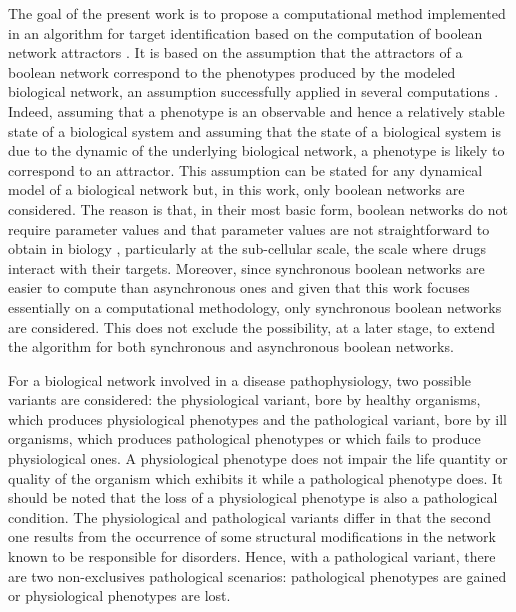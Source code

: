 \documentclass[oneside,a4paper,onecolumn,notitlepage,final]{article}
\begin{document}
The goal of the present work is to propose a computational method implemented in an algorithm for target identification based on the computation of boolean network attractors \cite{bornholdt2008boolean}. It is based on the assumption that the attractors of a boolean network correspond to the phenotypes produced by the modeled biological network, an assumption successfully applied in several computations \cite{huang2000shape,davidich2008boolean,faure2006dynamical,fumia2013boolean,creixell2012navigating,baverstock2011comparison}. Indeed, assuming that a phenotype is an observable and hence a relatively stable state of a biological system and assuming that the state of a biological system is due to the dynamic of the underlying biological network, a phenotype is likely to correspond to an attractor. This assumption can be stated for any dynamical model of a biological network but, in this work, only boolean networks are considered. The reason is that, in their most basic form, boolean networks do not require parameter values and that parameter values are not straightforward to obtain in biology \cite{wynn2012logic}, particularly at the sub-cellular scale, the scale where drugs interact with their targets. Moreover, since synchronous boolean networks are easier to compute than asynchronous ones \cite{garg2008synchronous} and given that this work focuses essentially on a computational methodology, only synchronous boolean networks are considered. This does not exclude the possibility, at a later stage, to extend the algorithm for both synchronous and asynchronous boolean networks.

For a biological network involved in a disease pathophysiology, two possible variants are considered: the physiological variant, bore by healthy organisms, which produces physiological phenotypes and the pathological variant, bore by ill organisms, which produces pathological phenotypes or which fails to produce physiological ones. A physiological phenotype does not impair the life quantity or quality of the organism which exhibits it while a pathological phenotype does. It should be noted that the loss of a physiological phenotype is also a pathological condition. The physiological and pathological variants differ in that the second one results from the occurrence of some structural modifications in the network known to be responsible for disorders. Hence, with a pathological variant, there are two non-exclusives pathological scenarios: pathological phenotypes are gained or physiological phenotypes are lost.
\end{document}
